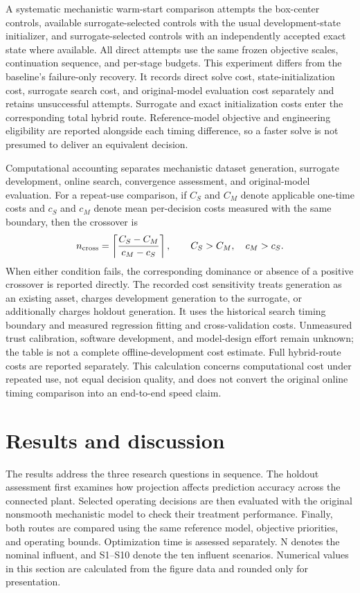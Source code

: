 \documentclass[a4paper,fleqn]{cas-sc}
\begin{document}
A systematic mechanistic warm-start comparison attempts the box-center controls, available surrogate-selected controls with the usual development-state initializer, and surrogate-selected controls with an independently accepted exact state where available. All direct attempts use the same frozen objective scales, continuation sequence, and per-stage budgets. This experiment differs from the baseline's failure-only recovery. It records direct solve cost, state-initialization cost, surrogate search cost, and original-model evaluation cost separately and retains unsuccessful attempts. Surrogate and exact initialization costs enter the corresponding total hybrid route. Reference-model objective and engineering eligibility are reported alongside each timing difference, so a faster solve is not presumed to deliver an equivalent decision.

Computational accounting separates mechanistic dataset generation, surrogate development, online search, convergence assessment, and original-model evaluation. For a repeat-use comparison, if $C_S$ and $C_M$ denote applicable one-time costs and $c_S$ and $c_M$ denote mean per-decision costs measured with the same boundary, then the crossover is
\begin{equation}
 n_{\rm cross}=\left\lceil\frac{C_S-C_M}{c_M-c_S}\right\rceil,
 \qquad C_S>C_M,\quad c_M>c_S.
 \label{eq:amortization}
\end{equation}
When either condition fails, the corresponding dominance or absence of a positive crossover is reported directly. The recorded cost sensitivity treats generation as an existing asset, charges development generation to the surrogate, or additionally charges holdout generation. It uses the historical search timing boundary and measured regression fitting and cross-validation costs. Unmeasured trust calibration, software development, and model-design effort remain unknown; the table is not a complete offline-development cost estimate. Full hybrid-route costs are reported separately. This calculation concerns computational cost under repeated use, not equal decision quality, and does not convert the original online timing comparison into an end-to-end speed claim.

\section{Results and discussion}
\label{sec:results}

The results address the three research questions in sequence. The holdout assessment first examines how projection affects prediction accuracy across the connected plant. Selected operating decisions are then evaluated with the original nonsmooth mechanistic model to check their treatment performance. Finally, both routes are compared using the same reference model, objective priorities, and operating bounds. Optimization time is assessed separately. N denotes the nominal influent, and S1--S10 denote the ten influent scenarios. Numerical values in this section are calculated from the figure data and rounded only for presentation.
\end{document}
